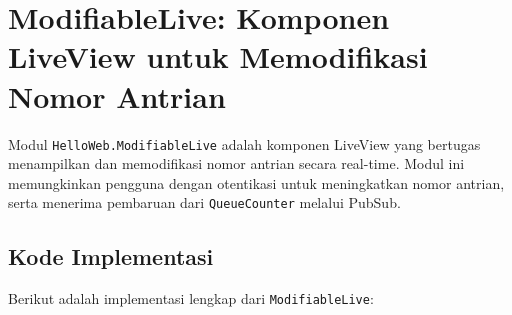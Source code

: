 \section{ModifiableLive: Komponen LiveView untuk Memodifikasi Nomor Antrian}

Modul \texttt{HelloWeb.ModifiableLive} adalah komponen LiveView yang bertugas menampilkan dan memodifikasi nomor antrian secara real-time. Modul ini memungkinkan pengguna dengan otentikasi untuk meningkatkan nomor antrian, serta menerima pembaruan dari \texttt{QueueCounter} melalui PubSub.

\subsection{Kode Implementasi}

Berikut adalah implementasi lengkap dari \texttt{ModifiableLive}:

